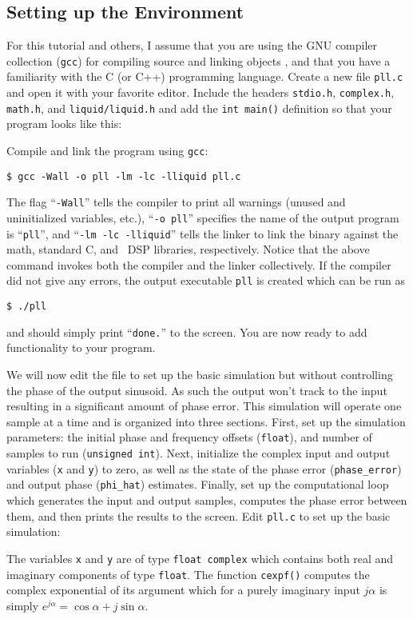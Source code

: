 \subsection{Setting up the Environment}
\label{tutorial:pll:environment}

For this tutorial and others, I assume that you are using the GNU
compiler collection ({\tt gcc}) for compiling source and linking objects
\cite{gcc:web},
and that you have a familiarity with the C (or C++) programming
language.
Create a new file {\tt pll.c} and open it with your favorite editor.
Include the headers {\tt stdio.h}, {\tt complex.h}, {\tt math.h}, and
{\tt liquid/liquid.h} and add the {\tt int main()} definition
so that your program looks like this:
%

%
Compile and link the program using {\tt gcc}:
%
\begin{Verbatim}[fontsize=\small]
    $ gcc -Wall -o pll -lm -lc -lliquid pll.c
\end{Verbatim}
%
The flag ``{\tt -Wall}'' tells the compiler to print all warnings
(unused and uninitialized variables, etc.),
``{\tt -o pll}'' specifies the name of the output program is
``{\tt pll}'', and
``{\tt -lm -lc -lliquid}'' tells the linker to link the binary against
the math, standard C, and \liquid\ DSP libraries, respectively.
Notice that the above command invokes both the compiler and the linker
collectively.
%
If the compiler did not give any errors, the output executable {\tt pll}
is created which can be run as
\begin{Verbatim}[fontsize=\small]
    $ ./pll
\end{Verbatim}
%
and should simply print ``{\tt done.}'' to the screen.
You are now ready to add functionality to your program.

We will now edit the file to set up the basic simulation but without
controlling the phase of the output sinusoid.
As such the output won't track to the input resulting in a significant
amount of phase error.
This simulation will operate one sample at a time and is organized into
three sections.
First, set up the simulation parameters: the initial phase and frequency
offsets ({\tt float}),
and number of samples to run ({\tt unsigned int}).
Next, initialize the complex input and output variables
({\tt x} and {\tt y}) to zero,
as well as the state of the phase error ({\tt phase\_error})
and output phase ({\tt phi\_hat}) estimates.
Finally, set up the computational loop which generates the input and
output samples, computes the phase error between them, and then prints
the results to the screen.
%
Edit {\tt pll.c} to set up the basic simulation:
%

%
The variables {\tt x} and {\tt y} are of type {\tt float complex} which
contains both real and imaginary components of type {\tt float}.
The function {\tt cexpf()} computes the complex exponential of its
argument which for a purely imaginary input $j\alpha$ is simply
$e^{j\alpha} = \cos\alpha + j\sin\alpha$.

